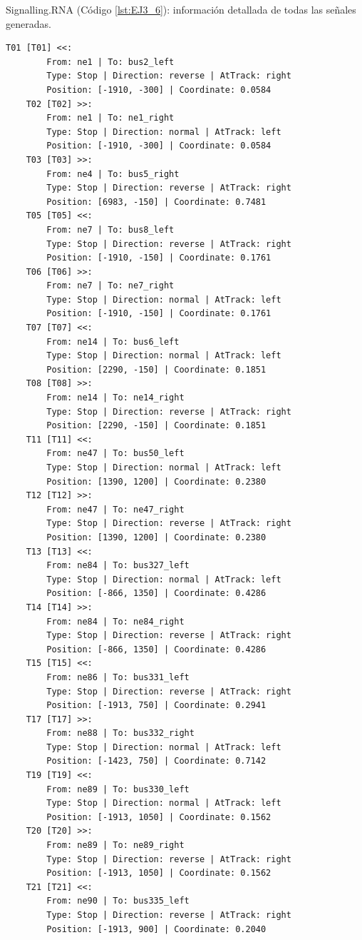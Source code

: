 	Signalling.RNA (Código \ref{lst:EJ3_6}): información detallada de todas las señales generadas.
	
	\begin{lstlisting}[language = {}, tabsize=4, basicstyle=\footnotesize\ttfamily, showspaces=false, showstringspaces=false, caption = Signalling.RNA, label = {lst:EJ3_6}]
	T01 [T01] <<:
		From: ne1 | To: bus2_left
		Type: Stop | Direction: reverse | AtTrack: right 
		Position: [-1910, -300] | Coordinate: 0.0584
	T02 [T02] >>:
		From: ne1 | To: ne1_right
		Type: Stop | Direction: normal | AtTrack: left 
		Position: [-1910, -300] | Coordinate: 0.0584
	T03 [T03] >>:
		From: ne4 | To: bus5_right
		Type: Stop | Direction: reverse | AtTrack: right 
		Position: [6983, -150] | Coordinate: 0.7481
	T05 [T05] <<:
		From: ne7 | To: bus8_left
		Type: Stop | Direction: reverse | AtTrack: right 
		Position: [-1910, -150] | Coordinate: 0.1761
	T06 [T06] >>:
		From: ne7 | To: ne7_right	
		Type: Stop | Direction: normal | AtTrack: left 
		Position: [-1910, -150] | Coordinate: 0.1761
	T07 [T07] <<:
		From: ne14 | To: bus6_left
		Type: Stop | Direction: normal | AtTrack: left 
		Position: [2290, -150] | Coordinate: 0.1851
	T08 [T08] >>:
		From: ne14 | To: ne14_right
		Type: Stop | Direction: reverse | AtTrack: right 
		Position: [2290, -150] | Coordinate: 0.1851
	T11 [T11] <<:
		From: ne47 | To: bus50_left
		Type: Stop | Direction: normal | AtTrack: left 
		Position: [1390, 1200] | Coordinate: 0.2380
	T12 [T12] >>:
		From: ne47 | To: ne47_right
		Type: Stop | Direction: reverse | AtTrack: right 
		Position: [1390, 1200] | Coordinate: 0.2380
	T13 [T13] <<:
		From: ne84 | To: bus327_left
		Type: Stop | Direction: normal | AtTrack: left 
		Position: [-866, 1350] | Coordinate: 0.4286
	T14 [T14] >>:
		From: ne84 | To: ne84_right
		Type: Stop | Direction: reverse | AtTrack: right 
		Position: [-866, 1350] | Coordinate: 0.4286
	T15 [T15] <<:
		From: ne86 | To: bus331_left
		Type: Stop | Direction: reverse | AtTrack: right 
		Position: [-1913, 750] | Coordinate: 0.2941
	T17 [T17] >>:
		From: ne88 | To: bus332_right
		Type: Stop | Direction: normal | AtTrack: left 
		Position: [-1423, 750] | Coordinate: 0.7142
	T19 [T19] <<:
		From: ne89 | To: bus330_left
		Type: Stop | Direction: normal | AtTrack: left 
		Position: [-1913, 1050] | Coordinate: 0.1562
	T20 [T20] >>:
		From: ne89 | To: ne89_right
		Type: Stop | Direction: reverse | AtTrack: right 
		Position: [-1913, 1050] | Coordinate: 0.1562
	T21 [T21] <<:
		From: ne90 | To: bus335_left
		Type: Stop | Direction: reverse | AtTrack: right 
		Position: [-1913, 900] | Coordinate: 0.2040

\end{lstlisting}
